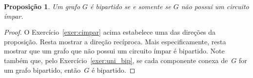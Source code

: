 \documentclass[12pt, a4paper]{article}
\newtheorem{prop}[teor]{Proposição}
\theoremstyle{definition}
\begin{document}
\begin{prop}
Um grafo $G$ é bipartido se e somente se $G$ não possui um circuito ímpar. 
\end{prop}

\begin{proof}
O Exercício~\ref{exer:cimpar} acima estabelece uma das direções da proposição. Resta mostrar a direção recíproca. Mais especificamente, resta mostrar que um grafo que não possui um circuito ímpar é bipartido. 
Note também que, pelo Exercício~\ref{exer:uni_bip}, se cada componente conexa de~$G$ for um grafo bipartido, então~$G$ é bipartido.
\end{proof}



\end{document}
